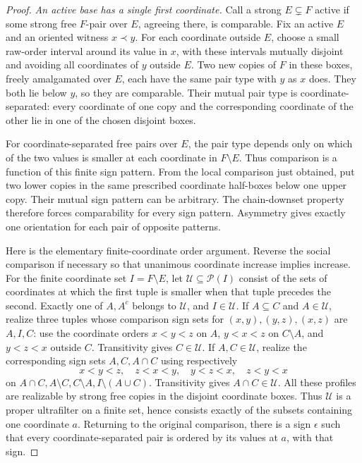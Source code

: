 \begin{proof}
\emph{An active base has a single first coordinate.}
Call a strong $E\subsetneq F$ active if some strong free
$F$-pair over $E$, agreeing there, is comparable. Fix an active
$E$ and an oriented witness $x\prec y$. For each coordinate
outside $E$, choose a small raw-order interval around its
value in $x$, with these intervals mutually disjoint and
avoiding all coordinates of $y$ outside $E$. Two new copies
of $F$ in these boxes, freely amalgamated over $E$, each have
the same pair type with $y$ as $x$ does. They both lie below
$y$, so they are comparable. Their mutual pair type is
coordinate-separated: every coordinate of one copy and the
corresponding coordinate of the other lie in one of the
chosen disjoint boxes.

For coordinate-separated free pairs over $E$, the pair type
depends only on which of the two values is smaller at each
coordinate in $F\setminus E$. Thus comparison is a function
of this finite sign pattern. From the local comparison just
obtained, put two lower copies in the same prescribed
coordinate half-boxes below one upper copy. Their mutual
sign pattern can be arbitrary. The chain-downset property
therefore forces comparability for every sign pattern.
Asymmetry gives exactly one orientation for each pair of
opposite patterns.

Here is the elementary finite-coordinate order argument.
Reverse the social comparison if necessary so that unanimous
coordinate increase implies increase. For the finite coordinate
set $I=F\setminus E$, let $\mathcal U\subseteq\mathcal P(I)$
consist of the sets of coordinates at which the first tuple
is smaller when that tuple precedes the second. Exactly one
of $A,A^c$ belongs to $\mathcal U$, and $I\in\mathcal U$.
If $A\subseteq C$ and $A\in\mathcal U$, realize three tuples
whose comparison sign sets for $(x,y),(y,z),(x,z)$ are
$A,I,C$: use the coordinate orders $x<y<z$ on $A$,
$y<x<z$ on $C\setminus A$, and $y<z<x$ outside $C$.
Transitivity gives $C\in\mathcal U$.
If $A,C\in\mathcal U$, realize the corresponding sign sets
$A,C,A\cap C$ using respectively
\[
 x<y<z,\quad z<x<y,\quad y<z<x,\quad z<y<x
\]
on $A\cap C,A\setminus C,C\setminus A,I\setminus(A\cup C)$.
Transitivity gives $A\cap C\in\mathcal U$.
All these profiles are realizable by strong free copies in
the disjoint coordinate boxes. Thus $\mathcal U$ is a proper
ultrafilter on a finite set, hence consists exactly of the
subsets containing one coordinate $a$. Returning to the
original comparison, there is a sign $\epsilon$ such that
every coordinate-separated pair is ordered by its values
at $a$, with that sign.


\end{proof}
